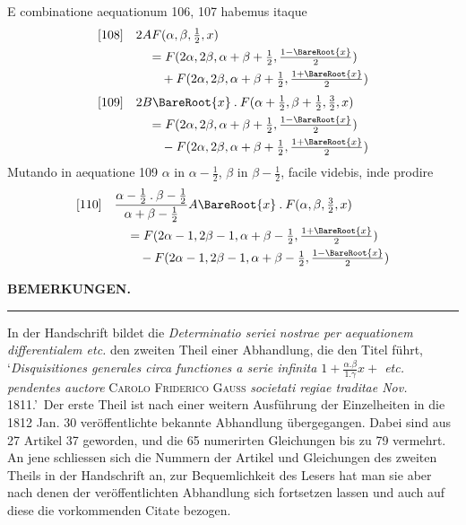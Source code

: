 E combinatione aequationum 106, 107 habemus itaque
\[
\begin{aligned}
{}[108]\quad&2AF(\alpha,\beta,\tfrac12,x)\\
&\quad=F(2\alpha,2\beta,\alpha+\beta+\tfrac12,\tfrac{1-\BareRoot{x}}2)\\&\qquad+F(2\alpha,2\beta,\alpha+\beta+\tfrac12,\tfrac{1+\BareRoot{x}}2)
\end{aligned}
\]
\[
\begin{aligned}
{}[109]\quad&2B\BareRoot{x}\mathbin{.}F(\alpha+\tfrac12,\beta+\tfrac12,\tfrac32,x)\\
&\quad=F(2\alpha,2\beta,\alpha+\beta+\tfrac12,\tfrac{1-\BareRoot{x}}2)\\&\qquad-F(2\alpha,2\beta,\alpha+\beta+\tfrac12,\tfrac{1+\BareRoot{x}}2)
\end{aligned}
\]
Mutando in aequatione 109 $\alpha$ in $\alpha-\frac12$, $\beta$ in $\beta-\frac12$, facile videbis, inde prodire
\[
\begin{aligned}
{}[110]\quad&\frac{\alpha-\tfrac12\mathbin{.}\beta-\tfrac12}{\alpha+\beta-\tfrac12}A\BareRoot{x}\mathbin{.}F(\alpha,\beta,\tfrac32,x)\\
&\quad=F(2\alpha-1,2\beta-1,\alpha+\beta-\tfrac12,\tfrac{1+\BareRoot{x}}2)\\&\qquad-F(2\alpha-1,2\beta-1,\alpha+\beta-\tfrac12,\tfrac{1-\BareRoot{x}}2)
\end{aligned}
\]
\clearpage{}
\begin{center}\textbf{BEMERKUNGEN.}\par\smallskip\rule{.15\linewidth}{.4pt}\end{center}
In der Handschrift bildet die \textit{Determinatio seriei nostrae per aequationem differentialem etc.} den zweiten Theil einer Abhandlung, die den Titel führt, \lq\textit{Disquisitiones generales circa functiones a serie infinita $1+\frac{\alpha.\beta}{1.\gamma}x+$ etc. pendentes auctore} \textsc{Carolo Friderico Gauss} \textit{societati regiae traditae Nov.} 1811.\rq\ Der erste Theil ist nach einer weitern Ausführung der Einzelheiten in die 1812 Jan. 30 veröffentlichte bekannte Abhandlung übergegangen. Dabei sind aus 27 Artikel 37 geworden, und die 65 numerirten Gleichungen bis zu 79 vermehrt. An jene schliessen sich die Nummern der Artikel und Gleichungen des zweiten Theils in der Handschrift an, zur Bequemlichkeit des Lesers hat man sie aber nach denen der veröffentlichten Abhandlung sich fortsetzen lassen und auch auf diese die vorkommenden Citate bezogen.

